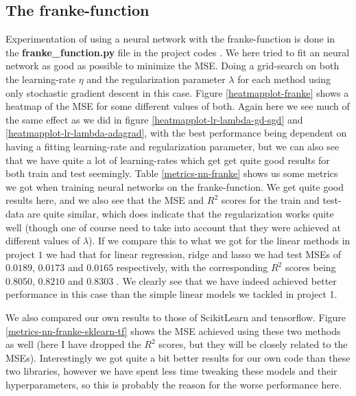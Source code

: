 \documentclass{article}
\begin{document}
\subsection{The franke-function}
Experimentation of using a neural network with the franke-function is done
in the \textbf{franke\_function.py} file in the project codes
\cite{githubrepoproject2code}. We here tried to fit an neural network as good as
possible to minimize the MSE. Doing a grid-search on both the learning-rate
$\eta$ and the regularization parameter $\lambda$ for each method using only
stochastic gradient descent in this case. Figure \ref{heatmapplot-franke} shows
a heatmap of the MSE for some different values of both. Again here we see much
of the same effect as we did in figure \ref{heatmapplot-lr-lambda-gd-sgd} and
\ref{heatmapplot-lr-lambda-adagrad}, with the best performance being dependent
on having a fitting learning-rate and regularization parameter, but we can also
see that we have quite a lot of learning-rates which get get quite good results
for both train and test seemingly. Table \ref{metrics-nn-franke} shows us some
metrics we got when training neural networks on the franke-function. We get
quite good results here, and we also see that the MSE and $R^2$ scores for the
train and test-data are quite similar, which does indicate that the
regularization works quite well (though one of course need to take into account
that they were achieved at different values of $\lambda$). If we compare this to
what we got for the linear methods in project $1$ we had that for linear
regression, ridge and lasso we had test MSEs of $0.0189$, $0.0173$ and $0.0165$
respectively, with the corresponding $R^2$ scores being $0.8050$, $0.8210$ and
$0.8303$ \cite[s.~4.1]{reportproject1}. We clearly see that we have indeed
achieved better performance in this case than the simple linear models we
tackled in project 1.

We also compared our own results to those of ScikitLearn and tensorflow. Figure
\ref{metrics-nn-franke-sklearn-tf} shows the MSE achieved using these two
methods as well (here I have dropped the $R^2$ scores, but they will be closely
related to the MSEs).  Interestingly we got quite a bit better results for our
own code than these two libraries, however we have spent less time tweaking these
models and their hyperparameters, so this is probably the reason for the worse
performance here.
\end{document}
